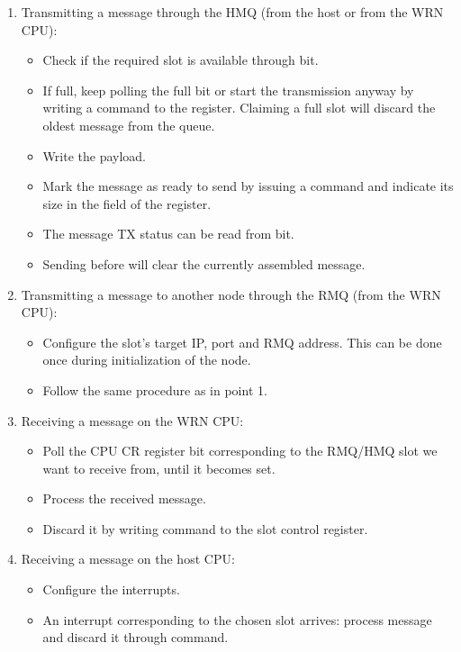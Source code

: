 \documentclass{article}
\begin{document}
\begin{enumerate}
\item Transmitting a message through the HMQ (from the host or from the WRN CPU):
  \begin{itemize}
  \item Check if the required slot is available through  bit.
  \item If full, keep polling the full bit or start the transmission anyway by writing a  command to the  register. Claiming a full
    slot will discard the oldest message from the queue.
  \item Write the payload.
  \item Mark the message as ready to send by issuing a  command and indicate its size in the  field of the  register. 
  \item The message TX status can be read from  bit.
  \item Sending  before  will clear the currently assembled message.
  \end{itemize}


\item Transmitting a message to another node through the RMQ (from the WRN CPU):
  \begin{itemize}
  \item Configure the slot's target IP, port and RMQ address. This can be done once during initialization of the node.
  \item Follow the same procedure as in point 1.
  \end {itemize}

\item Receiving a message on the WRN CPU:
  \begin{itemize}
  \item Poll the CPU CR  register bit corresponding to the RMQ/HMQ slot we want to receive from, until it becomes set.
  \item Process the received message.
  \item Discard it by writing  command to the slot control register.
  \end{itemize}

\item Receiving a message on the host CPU:
  \begin{itemize}
  \item Configure the interrupts.
  \item An interrupt corresponding to the chosen slot arrives: process message and discard it through  command.
  \end{itemize}
\end{enumerate}
\newpage
\end{document}
